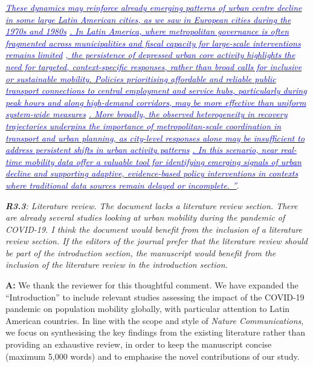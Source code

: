 \documentclass[12pt,a4paper,oneside, reqno]{amsart}
\begin{document}
{\begin{itemize}[noitemsep, topsep=0pt]
\end{itemize} }

\setlength{\leftskip}{1.3cm}\textcolor{blue}{\textit{\ul{These dynamics may reinforce already emerging patterns of urban centre decline in some large Latin American cities, as we saw in European cities during the 1970s and 1980s} \parencite{THORSTEN}\ul{. In Latin America, where metropolitan governance is often fragmented across municipalities and fiscal capacity for large-scale interventions remains limited} \parencite{un2022world, inostroza2013urban, fay2017rethinking, irazabal20governance}\ul{, the persistence of depressed urban core activity highlights the need for targeted, context-specific responses, rather than broad calls for inclusive or sustainable mobility. Policies prioritising affordable and reliable public transport connections to central employment and service hubs, particularly during peak hours and along high-demand corridors, may be more effective than uniform system-wide measures} \parencite{rivas2019urban, guzman2022effects}\ul{. More broadly, the observed heterogeneity in recovery trajectories underpins the importance of metropolitan-scale coordination in transport and urban planning, as city-level responses alone may be insufficient to address persistent shifts in urban activity patterns} \parencite{duque2021institutional}\ul{. In this scenario, near real-time mobility data offer a valuable tool for identifying emerging signals of urban decline and supporting adaptive, evidence-based policy interventions in contexts where traditional data sources remain delayed or incomplete. ''}}.}

\setlength{\leftskip}{0cm} \textit{\textbf{R3.3}: Literature review. The document lacks a literature review section. There are already several studies looking at urban mobility during the pandemic of COVID-19. I think the document would benefit from the inclusion of a literature review section. If the editors of the journal prefer that the literature review should be part of the introduction section, the manuscript would benefit from the inclusion of the literature review in the introduction section.}

\setlength{\leftskip}{1cm}\textbf{A:} We thank the reviewer for this thoughtful comment. We have expanded the ``Introduction'' to include relevant studies assessing the impact of the COVID-19 pandemic on population mobility globally, with particular attention to Latin American countries. In line with the scope and style of \textit{Nature Communications}, we focus on synthesising the key findings from the existing literature rather than providing an exhaustive review, in order to keep the manuscript concise (maximum 5,000 words) and to emphasise the novel contributions of our study.
\end{document}
